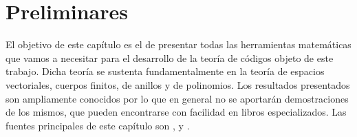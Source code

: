 \chapter{Preliminares}

El objetivo de este capítulo es el de presentar todas las herramientas matemáticas que vamos a necesitar para el desarrollo de la teoría de códigos objeto de este trabajo.
Dicha teoría se sustenta fundamentalmente en la teoría de espacios vectoriales, cuerpos finitos, de anillos y de polinomios.
Los resultados presentados son ampliamente conocidos por lo que en general no se aportarán demostraciones de los mismos, que pueden encontrarse con facilidad en libros especializados.
Las fuentes principales de este capítulo son \parencite[cap. 3 y 6]{cohn_algebra_1982}, \parencite[cap. 3]{cohn_algebra_1989} y \parencite[cap. 2]{lidl_introduction_1986}.







